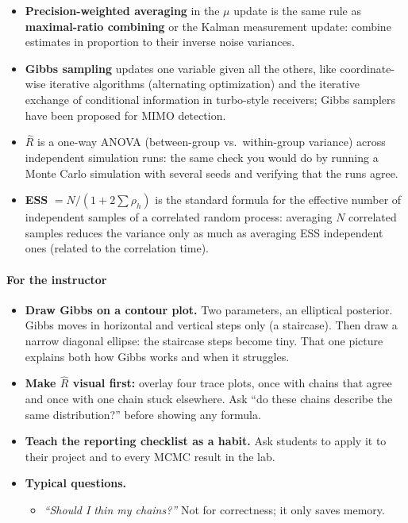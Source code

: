 \begin{itemize}
\tightlist
\item
  \textbf{Precision-weighted averaging} in the \(\mu\) update is the
  same rule as \textbf{maximal-ratio combining} or the Kalman
  measurement update: combine estimates in proportion to their inverse
  noise variances.
\item
  \textbf{Gibbs sampling} updates one variable given all the others,
  like coordinate-wise iterative algorithms (alternating optimization)
  and the iterative exchange of conditional information in turbo-style
  receivers; Gibbs samplers have been proposed for MIMO detection.
\item
  \textbf{\(\hat R\)} is a one-way ANOVA (between-group vs.~within-group
  variance) across independent simulation runs: the same check you would
  do by running a Monte Carlo simulation with several seeds and
  verifying that the runs agree.
\item
  \textbf{ESS} \(= N/(1 + 2\sum\rho_h)\) is the standard formula for the
  effective number of independent samples of a correlated random
  process: averaging \(N\) correlated samples reduces the variance only
  as much as averaging ESS independent ones (related to the correlation
  time).
\end{itemize}

\paragraph{For the instructor}

\begin{itemize}
\tightlist
\item
  \textbf{Draw Gibbs on a contour plot.} Two parameters, an elliptical
  posterior. Gibbs moves in horizontal and vertical steps only (a
  staircase). Then draw a narrow diagonal ellipse: the staircase steps
  become tiny. That one picture explains both how Gibbs works and when
  it struggles.
\item
  \textbf{Make \(\hat R\) visual first:} overlay four trace plots, once
  with chains that agree and once with one chain stuck elsewhere. Ask
  ``do these chains describe the same distribution?'' before showing any
  formula.
\item
  \textbf{Teach the reporting checklist as a habit.} Ask students to
  apply it to their project and to every MCMC result in the lab.
\item
  \textbf{Typical questions.}

  \begin{itemize}
  \tightlist
  \item
    \emph{``Should I thin my chains?''} Not for correctness; it only
    saves memory.
  \end{itemize}
\end{itemize}

